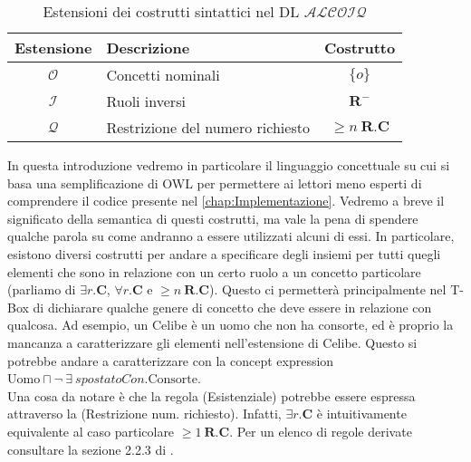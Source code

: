 \begin{table}
	\centering
	\begin{tabular}{c l c}
		\hline
		Estensione & Descrizione & Costrutto \\
		\hline
		$\mathcal{O}$ & Concetti nominali & $\{o\}$\\
		$\mathcal{I}$ & Ruoli inversi & $ \mathbf{R} ^-$\\
		$\mathcal{Q}$ & Restrizione del numero richiesto & $\ge n\ \mathbf{R} . \mathbf{C} $\\
		
		\hline
	\end{tabular}
	\caption{Estensioni dei costrutti sintattici nel DL $\mathcal{ALCOIQ}$}
	\label{tab:ALCOIQExtensions}
\end{table}
In questa introduzione vedremo in particolare il linguaggio concettuale su cui si basa una semplificazione di OWL per permettere ai lettori meno esperti di comprendere il codice presente nel \autoref{chap:Implementazione}.
\noindent
Vedremo a breve il significato della semantica di questi costrutti, ma vale la pena di spendere qualche parola su come andranno a essere utilizzati alcuni di essi. In particolare, esistono diversi costrutti per andare a specificare degli insiemi per tutti quegli elementi che sono in relazione con un certo ruolo a un concetto particolare (parliamo di $\exists r. \mathbf{C}$,  $\forall r. \mathbf{C}$ e $\ge n\ \mathbf{R} . \mathbf{C}$). Questo ci permetterà principalmente nel T-Box di dichiarare qualche genere di concetto che deve essere in relazione con qualcosa. Ad esempio, un Celibe è un uomo che non ha consorte, ed è proprio la mancanza a caratterizzare gli elementi nell'estensione di Celibe. Questo si potrebbe andare a caratterizzare con la concept expression $\text{Uomo}\sqcap \neg\ \exists\ \textit{spostatoCon}. \text{Consorte}$.\\
Una cosa da notare è che la regola (Esistenziale) potrebbe essere espressa attraverso la (Restrizione num. richiesto). Infatti, $\exists r. \mathbf{C}$ è intuitivamente equivalente al caso particolare $\ge 1\ \mathbf{R}. \mathbf{C}$. Per un elenco di regole derivate consultare la sezione 2.2.3 di \cite{leinbergerphdthesis}.


